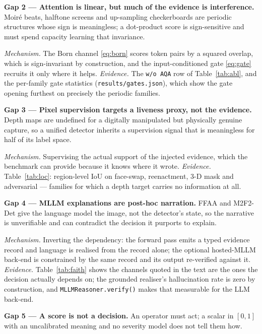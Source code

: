 \documentclass[conference]{IEEEtran}
\begin{document}
\medskip\noindent
\textbf{Gap 2 --- Attention is linear, but much of the evidence is interference.}
Moir\'e beats, halftone screens and up-sampling checkerboards are periodic
structures whose sign is meaningless; a dot-product score is sign-sensitive and
must spend capacity learning that invariance.

\emph{Mechanism.} The Born channel \eqref{eq:born} scores token pairs by a squared
overlap, which is sign-invariant by construction, and the input-conditioned gate
\eqref{eq:gate} recruits it only where it helps. \emph{Evidence.} The
\texttt{w/o AQA} row of Table~\ref{tab:abl}, and the per-family gate statistics
(\texttt{results/gates.json}), which show the gate opening furthest on precisely the
periodic families.

\medskip\noindent
\textbf{Gap 3 --- Pixel supervision targets a liveness proxy, not the evidence.}
Depth maps \cite{liu2018auxiliary,yu2021revisiting} are undefined for a digitally
manipulated but physically genuine capture, so a unified detector inherits a
supervision signal that is meaningless for half of its label space.

\emph{Mechanism.} Supervising the actual support of the injected evidence, which
the benchmark can provide because it knows where it wrote. \emph{Evidence.}
Table~\ref{tab:loc}: region-level IoU on face-swap, reenactment, 3-D mask and
adversarial --- families for which a depth target carries no information at all.

\medskip\noindent
\textbf{Gap 4 --- MLLM explanations are post-hoc narration.} FFAA
\cite{huang2024ffaa} and M2F2-Det \cite{guo2025m2f2det} give the language model the
image, not the detector's state, so the narrative is unverifiable and can contradict
the decision it purports to explain.

\emph{Mechanism.} Inverting the dependency: the forward pass emits a typed evidence
record and language is realised from the record alone; the optional hosted-MLLM
back-end is constrained by the same record and its output re-verified against it.
\emph{Evidence.} Table~\ref{tab:faith} shows the channels quoted in the text are the
ones the decision actually depends on; the grounded realiser's hallucination rate is
zero by construction, and \texttt{MLLMReasoner.verify()} makes that measurable for
the LLM back-end.

\medskip\noindent
\textbf{Gap 5 --- A score is not a decision.} An operator must act; a scalar in
$[0,1]$ with an uncalibrated meaning and no severity model does not tell them how.
\end{document}
